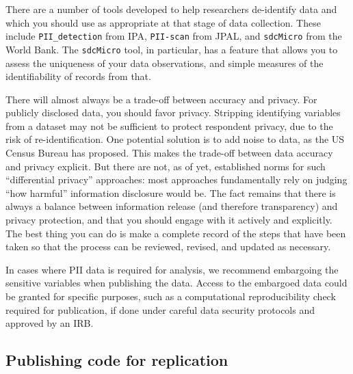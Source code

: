 There are a number of tools developed to help researchers de-identify data
and which you should use as appropriate at that stage of data collection.
These include \texttt{PII\_detection}
from IPA,
\texttt{PII-scan}
from JPAL,
and \texttt{sdcMicro}
from the World Bank.
The \texttt{sdcMicro} tool, in particular, has a feature
that allows you to assess the uniqueness of your data observations,
and simple measures of the identifiability of records from that.

There will almost always be a trade-off between accuracy and privacy.
For publicly disclosed data, you should favor privacy.
Stripping identifying variables from a dataset may not be sufficient to protect respondent privacy,
due to the risk of re-identification. 
One potential solution is to add noise to data, as the US Census Bureau has proposed.\cite{abowd2018us}
This makes the trade-off between data accuracy and privacy explicit.
But there are not, as of yet, established norms for such ``differential privacy'' approaches:
most approaches fundamentally rely on judging ``how harmful'' information disclosure would be.
The fact remains that there is always a balance between information release (and therefore transparency)
and privacy protection, and that you should engage with it actively and explicitly.
The best thing you can do is make a complete record of the steps that have been taken
so that the process can be reviewed, revised, and updated as necessary.

In cases where PII data is required for analysis,
we recommend embargoing the sensitive variables when publishing the data.
Access to the embargoed data could be granted for specific purposes,
such as a computational reproducibility check required for publication,
if done under careful data security protocols and approved by an IRB.


\subsection{Publishing code for replication}

